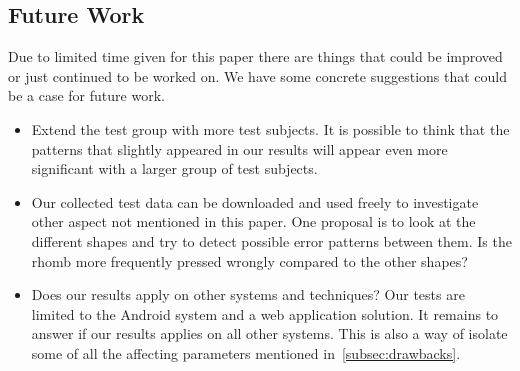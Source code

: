 \documentclass[runningheads,a4paper]{llncs}
\begin{document}
\subsection{Future Work}
Due to limited time given for this paper there are things that could be improved or just continued to be worked on. We have some concrete suggestions that could be a case for future work.

\begin{itemize}
	\item Extend the test group with more test subjects. It is possible to think that the patterns that slightly appeared in our results will appear even more significant with a larger group of test subjects.
	\item Our collected test data can be downloaded and used freely to investigate other aspect not mentioned in this paper. One proposal is to look at the different shapes and try to detect possible error patterns between them. Is the rhomb more frequently pressed wrongly compared to the other shapes?
	\item Does our results apply on other systems and techniques? Our tests are limited to the Android system and a web application solution. It remains to answer if our results applies on all other systems. This is also a way of isolate some of all the affecting parameters mentioned in~\ref{subsec:drawbacks}.
\end{itemize}

%
\nocite{*}  %
% 
%
%

%


\end{document}
